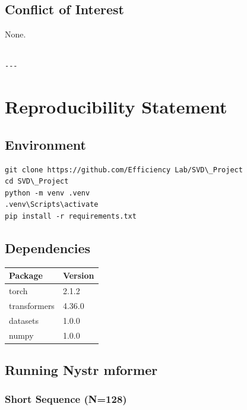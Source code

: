 \subsection{Conflict of Interest}

None.
\begin{lstlisting}

---
\end{lstlisting}


\section{Reproducibility Statement}

\subsection{Environment}

\begin{lstlisting}
git clone https://github.com/Efficiency Lab/SVD\_Project
cd SVD\_Project
python -m venv .venv
.venv\Scripts\activate
pip install -r requirements.txt
\end{lstlisting}

\subsection{Dependencies}

\begin{table}[H]
\centering
\small
\begin{tabular}{ll}
\toprule
\textbf{Package} & \textbf{Version} \\
\midrule
torch & 2.1.2 \\
transformers & 4.36.0 \\
datasets & 1.0.0 \\
numpy & 1.0.0 \\
\bottomrule
\end{tabular}
\end{table}

\subsection{Running Nystr mformer}

\subsubsection{Short Sequence (N=128)}

